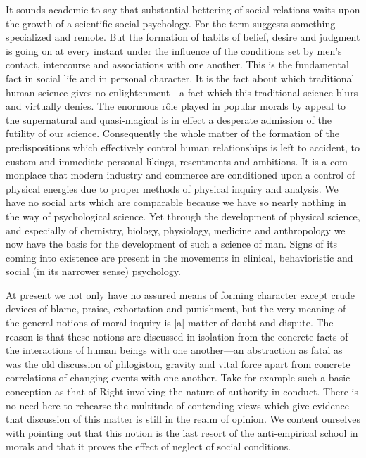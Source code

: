 It sounds academic to say that substantial bettering of social
relations waits upon the growth of a scientific social psychology. For
the term suggests something specialized and remote. But the formation
of habits of belief, desire and judgment is going on at every instant
under the influence of the conditions set by men's contact,
intercourse and associations with one another. This is the fundamental
fact in social life and in personal character. It is the fact about
which traditional human science gives no enlightenment---a fact which
this traditional science blurs and virtually denies. The enormous
r\^ole played in popular morals by appeal to the supernatural and
quasi-magical is in effect a desperate admission of the futility of
our science. Consequently the whole matter of the formation of the
predispositions which effectively control human relationships is left
to accident, to custom and immediate personal likings, resentments and
ambitions. It is a com-monplace that modern industry and
commerce are conditioned upon a control of physical energies due to
proper methods of physical inquiry and analysis. We have no social
arts which are comparable because we have so nearly nothing in the way
of psychological science. Yet through the development of physical
science, and especially of chemistry, biology, physiology, medicine
and anthropology we now have the basis for the development of such a
science of man. Signs of its coming into existence are present in the
movements in clinical, behavioristic and social (in its narrower
sense) psychology.

At present we not only have no assured means of forming character
except crude devices of blame, praise, exhortation and punishment, but
the very meaning of the general notions of moral inquiry is [a] matter
of doubt and dispute. The reason is that these notions are discussed
in isolation from the concrete facts of the interactions of human
beings with one another---an abstraction as fatal as was the old
discussion of phlogiston, gravity and vital force apart from concrete
correlations of changing events with one another. Take for example
such a basic conception as that of Right involving the nature of
authority in conduct. There is no need here to rehearse the multitude
of contending views which give evidence that discussion of this matter
is still in the realm of opinion. We content ourselves with pointing
out that this notion is the last resort of the anti-empirical school
in morals and that it proves the effect of neglect of social
conditions.

